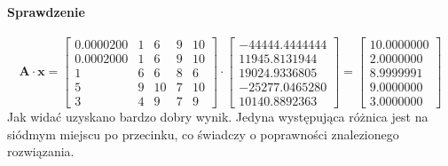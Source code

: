\documentclass[a4paper]{article}
\begin{document}
\paragraph{Sprawdzenie}
$$
\textbf{A} \cdot \textbf{x} = 
\left[
\begin{array}{ccccc}
0.0000200&1&6&9&10\\ 
0.0002000&1&6&9&10\\ 
1&6&6&8&6\\ 
5&9&10&7&10\\ 
3&4&9&7&9
\end{array}
\right]
\cdot 
\left[
\begin{array}{c}
-44444.4444444\\ 
11945.8131944\\ 
19024.9336805\\ 
-25277.0465280\\ 
10140.8892363
\end{array}
\right]
= 
\left[
\begin{array}{c}
10.0000000\\ 
2.0000000\\ 
8.9999991\\ 
9.0000000\\ 
3.0000000
\end{array}
\right]
$$
Jak widać uzyskano bardzo dobry wynik. Jedyna występująca różnica jest na siódmym miejscu po przecinku, co świadczy o poprawności znalezionego rozwiązania.
\end{document}
